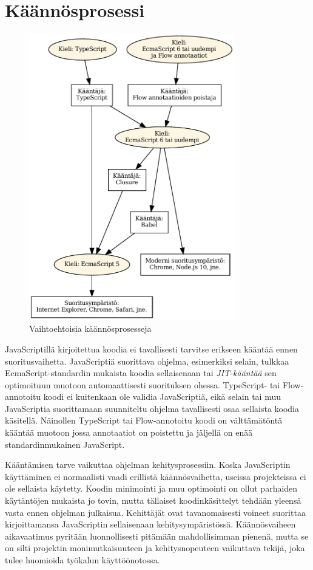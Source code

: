 \section{Käännösprosessi}
\begin{figure}[!htb]
\centering
\includegraphics[width=0.8\textwidth]{images/compilation.pdf}
\caption{Vaihtoehtoisia käännösprosesseja}
\label{fig:compilation}
\end{figure}
JavaScriptillä kirjoitettua koodia ei tavallisesti tarvitse
erikseen kääntää ennen suoritusvaihetta. JavaScriptiä suorittava ohjelma,
esimerkiksi selain, tulkkaa EcmaScript-standardin mukaista koodia
sellaisenaan tai \textit{JIT-kääntää} \cite{MozillaJIT}
sen optimoituun muotoon automaattisesti
suorituksen ohessa. TypeScript- tai Flow-annotoitu koodi ei kuitenkaan
ole validia JavaScriptiä, eikä selain tai muu JavaScriptia suorittamaan
suunniteltu ohjelma tavallisesti osaa sellaista koodia käsitellä.
Näinollen TypeScript tai Flow-annotoitu koodi on välttämätöntä kääntää muotoon jossa
annotaatiot on poistettu ja jäljellä on enää standardinmukainen JavaScript.

Kääntämisen tarve vaikuttaa ohjelman kehitysprosessiin.
Koska JavaScriptin käyttäminen ei normaalisti vaadi erillistä
käännösvaihetta, useissa projekteissa ei ole sellaista käytetty. Koodin
minimointi ja muu optimointi on ollut parhaiden käytäntöjen mukaista jo
tovin, mutta tällaiset koodinkäsittelyt tehdään yleensä vasta ennen ohjelman
julkaisua. Kehittäjät ovat tavanomaisesti voineet suorittaa kirjoittamansa
JavaScriptin sellaisenaan kehitysympäristössä. Käännösvaiheen aikavaatimus
pyritään luonnollisesti pitämään mahdollisimman pienenä, mutta se on silti
projektin monimutkaisuuteen ja kehitysnopeuteen vaikuttava tekijä, joka
tulee huomioida työkalun käyttöönotossa.

